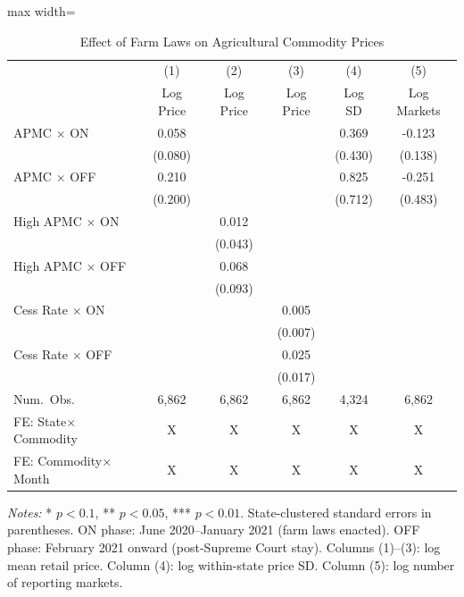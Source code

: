 \begin{table}[htbp]
\centering
\caption{Effect of Farm Laws on Agricultural Commodity Prices}
\label{tab:main_results}
\begin{adjustbox}{max width=\textwidth}
\begin{tabular}{lccccc}
\toprule
& (1) & (2) & (3) & (4) & (5) \\
& Log Price & Log Price & Log Price & Log SD & Log Markets \\
\midrule
APMC $\times$ ON & 0.058 & & & 0.369 & -0.123 \\
& (0.080) & & & (0.430) & (0.138) \\
APMC $\times$ OFF & 0.210 & & & 0.825 & -0.251 \\
& (0.200) & & & (0.712) & (0.483) \\
High APMC $\times$ ON & & 0.012 & & & \\
& & (0.043) & & & \\
High APMC $\times$ OFF & & 0.068 & & & \\
& & (0.093) & & & \\
Cess Rate $\times$ ON & & & 0.005 & & \\
& & & (0.007) & & \\
Cess Rate $\times$ OFF & & & 0.025 & & \\
& & & (0.017) & & \\
\midrule
Num.\ Obs. & 6,862 & 6,862 & 6,862 & 4,324 & 6,862 \\
FE: State$\times$Commodity & X & X & X & X & X \\
FE: Commodity$\times$Month & X & X & X & X & X \\
\bottomrule
\end{tabular}
\end{adjustbox}
\par\vspace{0.3em}
{\small\textit{Notes:} * $p < 0.1$, ** $p < 0.05$, *** $p < 0.01$.
State-clustered standard errors in parentheses.
ON phase: June 2020--January 2021 (farm laws enacted).
OFF phase: February 2021 onward (post-Supreme Court stay).
Columns (1)--(3): log mean retail price. Column (4): log within-state price SD.
Column (5): log number of reporting markets.}
\end{table}
